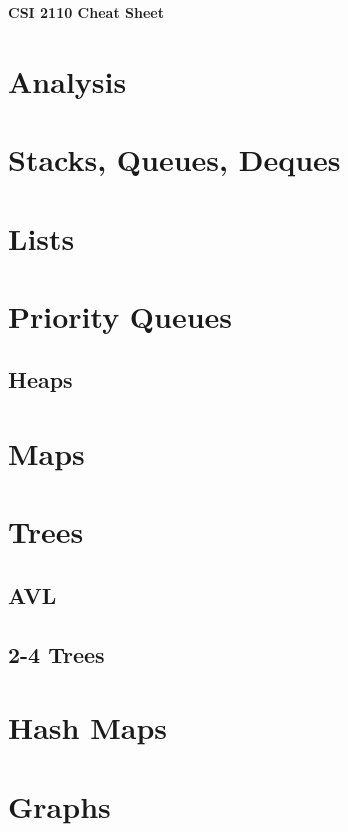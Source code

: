 \documentclass[12pt,letterpaper]{article} \usepackage{amsmath} \usepackage{graphicx} \usepackage[margin=1in]{geometry} \usepackage{longtable}  \usepackage{amssymb}
\begin{document}
	
	\begin{center}
		\Large\textbf{CSI 2110 Cheat Sheet} \\
		\vspace{0.5em}
	\end{center}
	
	\section{Analysis}
	
	\section{Stacks, Queues, Deques}
	
	\section{Lists}
	
	\section{Priority Queues}
	
	\subsection{Heaps}
	
	\section{Maps}
	
	\section{Trees}
	
	\subsection{AVL}
	
	\subsection{2-4 Trees}
	
	\section{Hash Maps}
	
	\section{Graphs}
	
\end{document}
